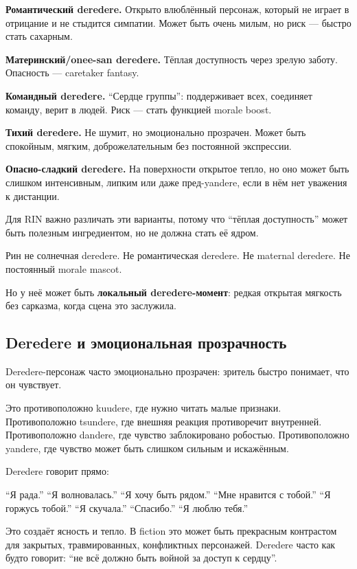 \textbf{Романтический deredere.} Открыто влюблённый персонаж, который не
играет в отрицание и не стыдится симпатии. Может быть очень милым, но
риск --- быстро стать сахарным.

\textbf{Материнский/\hspace{0pt}onee-san deredere.} Тёплая доступность через зрелую
заботу. Опасность --- caretaker fantasy.

\textbf{Командный deredere.} ``Сердце группы'': поддерживает всех,
соединяет команду, верит в людей. Риск --- стать функцией morale boost.

\textbf{Тихий deredere.} Не шумит, но эмоционально прозрачен. Может быть
спокойным, мягким, доброжелательным без постоянной экспрессии.

\textbf{Опасно-сладкий deredere.} На поверхности открытое тепло, но оно
может быть слишком интенсивным, липким или даже пред-yandere, если в нём
нет уважения к дистанции.

Для RIN важно различать эти варианты, потому что ``тёплая доступность''
может быть полезным ингредиентом, но не должна стать её ядром.

Рин не солнечная deredere. Не романтическая deredere. Не maternal
deredere. Не постоянный morale mascot.

Но у неё может быть \textbf{локальный deredere-момент}: редкая открытая
мягкость без сарказма, когда сцена это заслужила.

\subsection*{Deredere и эмоциональная прозрачность}

Deredere-персонаж часто эмоционально прозрачен: зритель быстро понимает,
что он чувствует.

Это противоположно kuudere, где нужно читать малые признаки.
Противоположно tsundere, где внешняя реакция противоречит внутренней.
Противоположно dandere, где чувство заблокировано робостью.
Противоположно yandere, где чувство может быть слишком сильным и
искажённым.

Deredere говорит прямо:

``Я рада.'' ``Я волновалась.'' ``Я хочу быть рядом.'' ``Мне нравится с
тобой.'' ``Я горжусь тобой.'' ``Я скучала.'' ``Спасибо.'' ``Я люблю
тебя.''

Это создаёт ясность и тепло. В fiction это может быть прекрасным
контрастом для закрытых, травмированных, конфликтных персонажей.
Deredere часто как будто говорит: ``не всё должно быть войной за доступ
к сердцу''.

